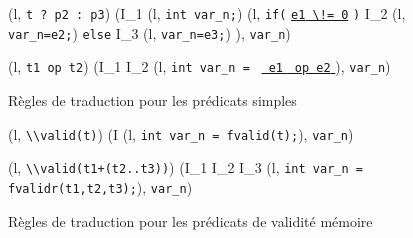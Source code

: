 \begin{figure*}[bt]
{    {
      {
        (l, \mbox{\lstinline't ? p2 : p3'}) 
        (I_1 \concat (l, \mbox{\lstinline'int var_n;'})
        \concat (l,  \mbox{\lstinline'if('}
        \underline{\mbox{\lstinline'e1'}\Zclear \mbox{\lstinline' \!= 0'}}
        \mbox{\lstinline')'} \bopen
        I_2 \concat (l, \mbox{\lstinline'var_n=e2;'}) \bclose
        \mbox{\lstinline'else'} \bopen
        I_3 \concat (l, \mbox{\lstinline'var_n=e3;'}) \bclose),
        \mbox{\lstinline'var_n'})
      }
    }

    {
      {(l, \mbox{\lstinline't1 op t2'}) 
        (I_1 \concat I_2 \concat (l,
        \mbox{\lstinline'int var_n ='}~
        \underline{\mbox{\lstinline' e1'} \Zclear \mbox{\lstinline' op e2'}
          \Zclear}
        \semicolon
        ), \mbox{\lstinline'var_n'})}
    }
  }
  \caption{Règles de traduction pour les prédicats simples}
  \label{fig:pred-logic}
\end{figure*}

\begin{figure*}[bt]
  \scriptsize{
    {\myinference[$\pi$-valid]
      {}
      {(l, \mbox{\lstinline'\\valid(t)'}) 
        (I \concat (l, \mbox{\lstinline'int var_n = fvalid(t);'}),
        \mbox{\lstinline'var_n'})
      }
    }

    {
      {
        (l, \mbox{\lstinline'\\valid(t1+(t2..t3))'}) 
        (I_1 \concat I_2 \concat I_3
        \concat (l, \mbox{\lstinline'int var_n = fvalidr(t1,t2,t3);'}),
        \mbox{\lstinline'var_n'})
      }
    }
  }
  \caption{Règles de traduction pour les prédicats de validité mémoire}
  \label{fig:valid}
\end{figure*}

